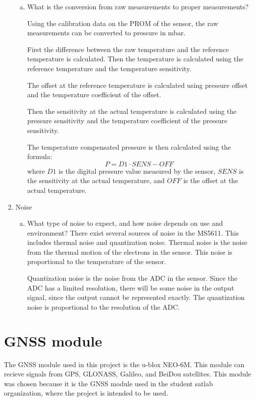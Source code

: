 \begin{enumerate}
\begin{enumerate}[(a)]
        \item What is the conversion from raw measurements to proper measurements?

        Using the calibration data on the PROM of the sensor, the raw measurements can be converted to pressure in mbar.

        First the difference between the raw temperature and the reference temperature is calculated.
        Then the temperature is calculated using the reference temperature and the temperature sensitivity.

        The offset at the reference temperature is calculated using pressure offset and the temperature coefficient of the offset.

        Then the sensitivity at the actual temperature is calculated using the pressure sensitivity and the temperature coefficient of the pressure sensitivity. %

        The temperature compensated pressure is then calculated using the formula:
        \begin{equation}
            P = D1 \cdot SENS - OFF
        \end{equation}
        where $D1$ is the digital pressure value measured by the sensor, $SENS$ is the sensitivity at the actual temperature, and $OFF$ is the offset at the actual temperature.
    \end{enumerate}
    \item Noise
    \begin{enumerate}[(a)]
        \item What type of noise to expect, and how noise depends on use and environment?
        There exist several sources of noise in the MS5611.
        This includes thermal noise and quantization noise.
        Thermal noise is the noise from the thermal motion of the electrons in the sensor.
        This noise is proportional to the temperature of the sensor.

        Quantization noise is the noise from the ADC in the sensor.
        Since the ADC has a limited resolution, there will be some noise in the output signal, since the output cannot be represented exactly.
        The quantization noise is proportional to the resolution of the ADC.
    \end{enumerate}
\end{enumerate}


\section{GNSS module}\label{sec:gnss-module}
The GNSS module used in this project is the u-blox NEO-6M.
This module can recieve signals from GPS, GLONASS, Galileo, and BeiDou satellites.
This module was chosen because it is the GNSS module used in the student satlab organization, where the project is intended to be used.

